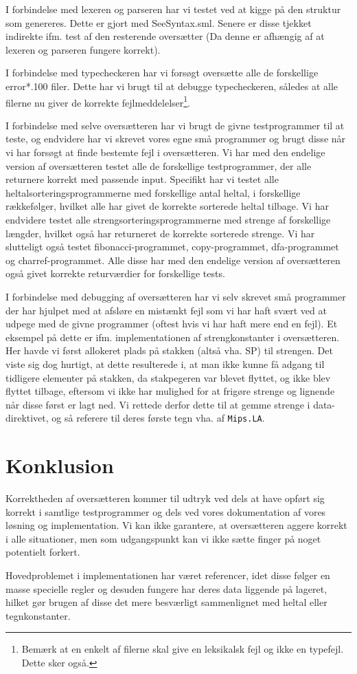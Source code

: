 \documentclass[a4paper, 10pt]{article}
\begin{document}
I forbindelse med lexeren og parseren har vi testet ved at kigge på den struktur
som genereres. Dette er gjort med SeeSyntax.sml. Senere er disse tjekket indirekte
ifm. test af den resterende oversætter (Da denne er afhængig af at lexeren og
parseren fungere korrekt).

I forbindelse med typecheckeren har vi forsøgt oversætte alle de forskellige 
error*.100 filer. Dette har vi brugt til at debugge typecheckeren, således at alle
filerne nu giver de korrekte fejlmeddelelser\footnote{Bemærk at en enkelt af 
filerne skal give en leksikalsk fejl og ikke en typefejl. Dette sker også.}.

I forbindelse med selve oversætteren har vi brugt de givne testprogrammer til
at teste, og endvidere har vi skrevet vores egne små programmer og brugt disse 
når vi har forsøgt at finde bestemte fejl i oversætteren. Vi har med den endelige
version af oversætteren testet alle de forskellige testprogrammer, der alle 
returnere korrekt med passende input. Specifikt har vi testet alle 
heltalsorteringsprogrammerne med forskellige antal heltal, i forskellige 
rækkefølger, hvilket alle har givet de korrekte sorterede heltal tilbage. 
Vi har endvidere testet alle strengsorteringsprogrammerne med strenge af 
forskellige længder, hvilket også har returneret de korrekte sorterede strenge.
Vi har slutteligt også testet fibonacci-programmet, copy-programmet, 
dfa-programmet og charref-programmet. Alle disse har med den endelige version af
oversætteren også givet korrekte returværdier for forskellige tests.

I forbindelse med debugging af oversætteren har vi selv skrevet små programmer 
der har hjulpet med at afsløre en mistænkt fejl som vi har haft svært ved at
udpege med de givne programmer (oftest hvis vi har haft mere end en fejl). Et 
eksempel på dette er ifm. implementationen af strengkonstanter i oversætteren. 
Her havde vi først allokeret plads på stakken (altså vha. SP) til strengen. Det 
viste sig dog hurtigt, at dette resulterede i, at man ikke kunne få adgang til
tidligere elementer på stakken, da stakpegeren var blevet flyttet, og ikke blev 
flyttet tilbage, eftersom vi ikke har mulighed for at frigøre strenge og 
lignende når disse først er lagt ned. Vi rettede derfor dette til at gemme 
strenge i data-direktivet, og så referere til deres første tegn vha. af 
\texttt{Mips.LA}.


\section{Konklusion}
Korrektheden af oversætteren kommer til udtryk ved dels at have opført sig
korrekt i samtlige testprogrammer og dels ved vores dokumentation af vores
løsning og implementation. Vi kan ikke garantere, at oversætteren aggere korrekt
i alle situationer, men som udgangspunkt kan vi ikke sætte finger på noget
potentielt forkert.

Hovedproblemet i implementationen har været referencer, idet disse følger en
masse specielle regler og desuden fungere har deres data liggende på lageret,
hilket gør brugen af disse det mere besværligt sammenlignet med heltal eller
tegnkonstanter.
\end{document}
